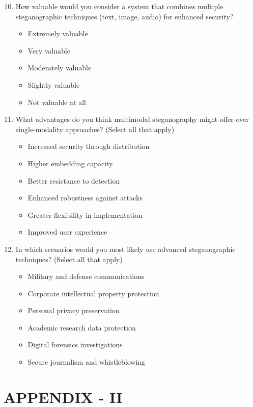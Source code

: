\documentclass[12pt, a4paper, oneside]{book}
\begin{document}
\begin{enumerate}\setcounter{enumi}{9}
    \item How valuable would you consider a system that combines multiple steganographic techniques (text, image, audio) for enhanced security?
    \begin{itemize}
        \item Extremely valuable
        \item Very valuable
        \item Moderately valuable
        \item Slightly valuable
        \item Not valuable at all
    \end{itemize}

    \item What advantages do you think multimodal steganography might offer over single-modality approaches? (Select all that apply)
    \begin{itemize}
        \item Increased security through distribution
        \item Higher embedding capacity
        \item Better resistance to detection
        \item Enhanced robustness against attacks
        \item Greater flexibility in implementation
        \item Improved user experience
    \end{itemize}

    \item In which scenarios would you most likely use advanced steganographic techniques? (Select all that apply)
    \begin{itemize}
        \item Military and defense communications
        \item Corporate intellectual property protection
        \item Personal privacy preservation
        \item Academic research data protection
        \item Digital forensics investigations
        \item Secure journalism and whistleblowing
    \end{itemize}
\end{enumerate}

\chapter{APPENDIX - II}
\end{document}
